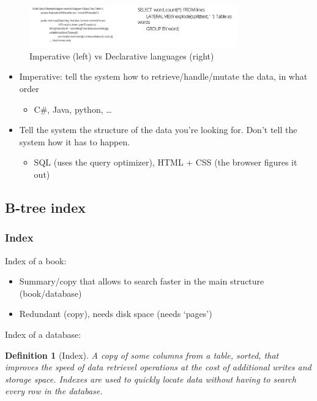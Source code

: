 \documentclass{article}
\newtheorem{theorem}{Definition}[section]
\begin{document}
\begin{figure}[H]
    \centering
    \includegraphics[width=0.8\textwidth]{imperative-vs-declarative.png}
    \caption{Imperative (left) vs Declarative languages (right)}
\end{figure}

\begin{itemize}
    \item Imperative: tell the system how to retrieve/handle/mutate the data, in what order
    \begin{itemize}
        \item C\#, Java, python, \dots
    \end{itemize}
    \item Tell the system the structure of the data you're looking for. Don't tell the system how it has to happen. 
    \begin{itemize}
        \item SQL (uses the query optimizer), HTML + CSS (the browser figures it out)
    \end{itemize}
\end{itemize}

\subsection{B-tree index}

\subsubsection{Index}

Index of a book:

\begin{itemize}
    \item Summary/copy that allows to search faster in the main structure (book/database)
    \item Redundant (copy), needs disk space (needs `pages')
\end{itemize}

Index of a database:

\begin{theorem}[Index]
    A copy of some columns from a table, sorted, that improves the speed of data retrievel operations at the cost of additional writes and storage space.
    Indexes are used to quickly locate data without having to search every row in the database.
\end{theorem}
\end{document}

